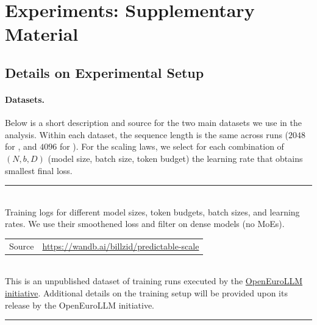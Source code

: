 %
\tableofcontents
%


\section{Experiments: Supplementary Material}\label{sec:app:experiments-supplementary}

\subsection{Details on Experimental Setup}\label{sec:app:experiment-setup}

\paragraph{Datasets.} Below is a short description and source for the two main datasets we use in the analysis. Within each dataset, the sequence length is the same across runs ($2048$ for \li{}, and $4096$ for \oellm{}). For the scaling laws, we select for each combination of $(N,b,D)$ (model size, batch size, token budget) the learning rate that obtains smallest final loss.

\noindent\rule{\textwidth}{1pt}
\begin{description}[listparindent=0pt,leftmargin=1.0em,]
	\item[\li] \hfill \citep{Li2025}~\\[.5em]
	Training logs for different model sizes, token budgets, batch sizes, and learning rates. We use their smoothened loss and filter on dense models (no MoEs).
	
	
    \begin{tabular}{@{}ll@{}}
		Source & \small \url{https://wandb.ai/billzid/predictable-scale}
	\end{tabular}

	\item[\oellm] \hfill \citep{OpenEuroLLM2026}~\\[.5em]
    This is an unpublished dataset of training runs executed by the \href{www.openeurollm.eu}{OpenEuroLLM initiative}. Additional details on the training setup will be provided upon its release 
	by the OpenEuroLLM initiative. 
	
	
\end{description}
\noindent\rule{\textwidth}{1pt}


